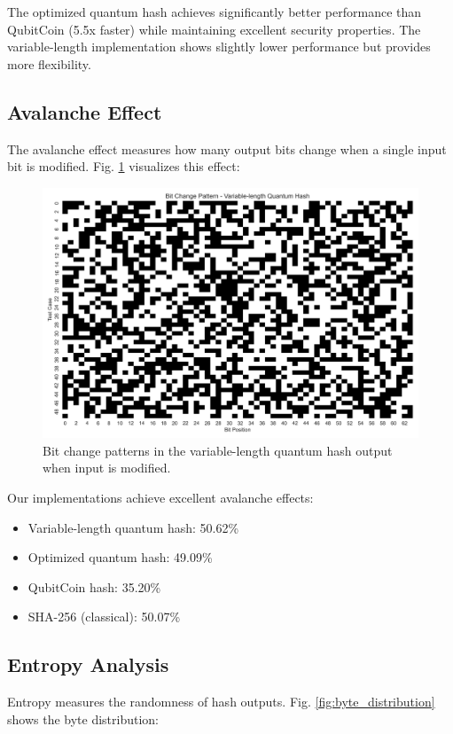 \documentclass[conference]{IEEEtran}
\begin{document}
The optimized quantum hash achieves significantly better performance than QubitCoin (5.5x faster) while maintaining excellent security properties. The variable-length implementation shows slightly lower performance but provides more flexibility.

\subsection{Avalanche Effect}
The avalanche effect measures how many output bits change when a single input bit is modified. Fig. \ref{fig:bit_changes} visualizes this effect:

\begin{figure}[!ht]
\centering
\includegraphics[width=\columnwidth]{visualizations/bit_changes_Variable-length_Quantum_Hash.png}
\caption{Bit change patterns in the variable-length quantum hash output when input is modified.}
\label{fig:bit_changes}
\end{figure}

Our implementations achieve excellent avalanche effects:
\begin{itemize}
    \item Variable-length quantum hash: 50.62\%
    \item Optimized quantum hash: 49.09\%
    \item QubitCoin hash: 35.20\%
    \item SHA-256 (classical): 50.07\%
\end{itemize}

\subsection{Entropy Analysis}
Entropy measures the randomness of hash outputs. Fig. \ref{fig:byte_distribution} shows the byte distribution:
\end{document}
